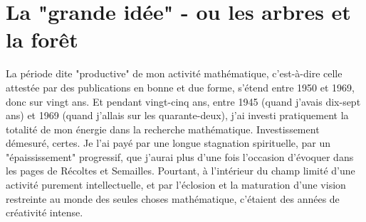 \section{La "grande idée" - ou les arbres et la forêt}

La période dite "productive" de mon activité mathématique, c'est-à-dire celle attestée par des publications en bonne et due forme, s'étend entre 1950 et 1969, donc sur vingt ans. Et pendant vingt-cinq ans, entre 1945 (quand j'avais dix-sept ans) et 1969 (quand j'allais sur les quarante-deux), j'ai investi pratiquement la totalité de mon énergie dans la recherche mathématique. Investissement démesuré, certes. Je l'ai payé par une longue stagnation spirituelle, par un "épaississement" progressif, que j'aurai plus d'une fois l'occasion d'évoquer dans les pages de Récoltes et Semailles. Pourtant, à l'intérieur du champ limité d'une activité purement intellectuelle, et par l'éclosion et la maturation d'une vision restreinte au monde des seules choses mathématique, c'étaient des années de créativité intense.

